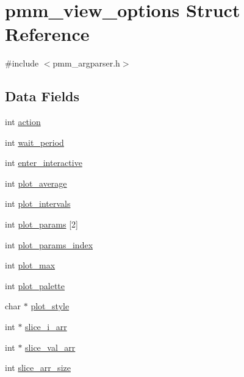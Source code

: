 \hypertarget{structpmm__view__options}{\section{pmm\-\_\-view\-\_\-options Struct Reference}
\label{structpmm__view__options}
}


{\ttfamily \#include $<$pmm\-\_\-argparser.\-h$>$}

\subsection*{Data Fields}
\begin{DoxyCompactItemize}
\item 
int \hyperlink{structpmm__view__options_aeef62de5e0377da63faaa1aeb35bdbcd}{action}
\item 
int \hyperlink{structpmm__view__options_afe6ee5c0574574901ddd99d2e46ba967}{wait\-\_\-period}
\item 
int \hyperlink{structpmm__view__options_ae698b0628d4e12d28d50be208b2ddceb}{enter\-\_\-interactive}
\item 
int \hyperlink{structpmm__view__options_a41c9f92e6ae2283c2e5deb210cb60a0e}{plot\-\_\-average}
\item 
int \hyperlink{structpmm__view__options_a9ba939ab2676ac655741e5116d281127}{plot\-\_\-intervals}
\item 
int \hyperlink{structpmm__view__options_a5ae677d6cdfed4a13da9bc5fe67ee096}{plot\-\_\-params} \mbox{[}2\mbox{]}
\item 
int \hyperlink{structpmm__view__options_ad63e467415609e0a5a953fa4d8471190}{plot\-\_\-params\-\_\-index}
\item 
int \hyperlink{structpmm__view__options_a76e8bdc0be034f236248e940937f2633}{plot\-\_\-max}
\item 
int \hyperlink{structpmm__view__options_a18c4c567608fe7225ca749fc4139ab6c}{plot\-\_\-palette}
\item 
char $\ast$ \hyperlink{structpmm__view__options_a913a0d3e709b08130337dbf29eb300bb}{plot\-\_\-style}
\item 
int $\ast$ \hyperlink{structpmm__view__options_a14df900d0381d9b54dfb8adff694cdb6}{slice\-\_\-i\-\_\-arr}
\item 
int $\ast$ \hyperlink{structpmm__view__options_a5ccace893d361181b411813fa571cae2}{slice\-\_\-val\-\_\-arr}
\item 
int \hyperlink{structpmm__view__options_a517a561755bbcf20141dbb262199ed76}{slice\-\_\-arr\-\_\-size}

\end{DoxyCompactItemize}
